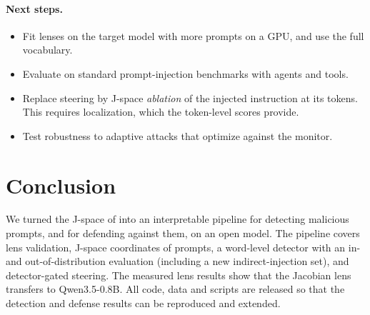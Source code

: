 \paragraph{Next steps.}
\begin{itemize}
  \item Fit lenses on the target model with more prompts on a GPU, and use the full
        vocabulary.
  \item Evaluate on standard prompt-injection benchmarks with agents and tools.
  \item Replace steering by J-space \emph{ablation} of the injected instruction at its
        tokens. This requires localization, which the token-level scores provide.
  \item Test robustness to adaptive attacks that optimize against the monitor.
\end{itemize}

\section{Conclusion}

We turned the J-space of \citet{gurnee2026workspace} into an interpretable pipeline for
detecting malicious prompts, and for defending against them, on an open model. The pipeline
covers lens validation, J-space coordinates of prompts, a word-level detector with an
in- and out-of-distribution evaluation (including a new indirect-injection set), and
detector-gated steering. The measured lens results show that the Jacobian lens transfers to
Qwen3.5-0.8B. All code, data and scripts are released so that the detection and defense
results can be reproduced and extended.
